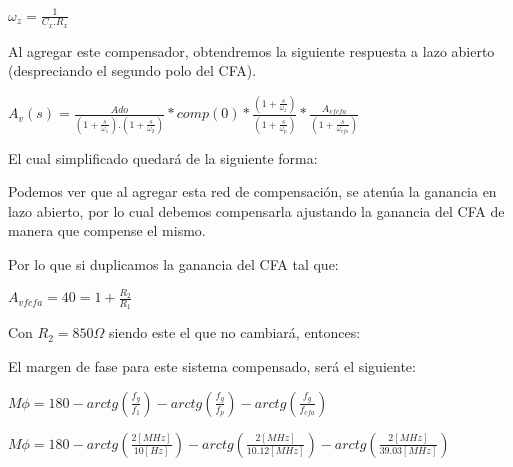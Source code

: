     \begin{center}
        $\omega_z = \frac{1}{C_x.R_x}$
    \end{center}

    \begin{center}
    \end{center}

    Al agregar este compensador, obtendremos la siguiente respuesta a lazo abierto (despreciando el segundo polo del CFA).

    \begin{center}
        $A_v(s)= \frac{Ado}{(1+ \frac{s}{\omega_1}).(1+ \frac{s}{\omega_2})} * comp(0)*\frac{(1+\frac{s}{\omega_z})}{(1+\frac{s}{\omega_p})} * \frac{A_{vfcfa}}{(1+\frac{s}{\omega_{cfa}})}$
    \end{center}

    El cual simplificado quedará de la siguiente forma:

    \begin{center}
    \end{center}

    Podemos ver que al agregar esta red de compensación, se atenúa la ganancia en lazo abierto, por lo cual debemos compensarla ajustando la ganancia del CFA de manera que compense el mismo.

    Por lo que si duplicamos la ganancia del CFA tal que:

    \begin{center}
        $A_{vfcfa} = 40 = 1 + \frac{R_2}{R_1}$
    \end{center}

    Con $R_2 = 850\Omega$ siendo este el que no cambiará, entonces:

    \begin{center}
    \end{center}
    
    El margen de fase para este sistema compensado, será el siguiente:

    \begin{center}
        $M\phi = 180 - arctg(\frac{f_g}{f_1}) - arctg(\frac{f_g}{f_p}) - arctg(\frac{f_g}{f_{cfa}})$
    \end{center}

    \begin{center}
        $M\phi = 180 - arctg(\frac{2 [MHz]}{10 [Hz]}) - arctg(\frac{2 [MHz]}{10.12 [MHz]}) - arctg(\frac{2 [MHz]}{39.03 [MHz]})$
    \end{center}

